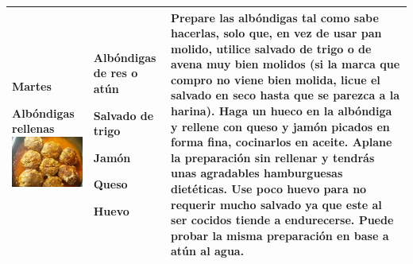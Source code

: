 \documentclass[menu.tex]{subfiles}
\begin{document}
\begin{tabular} {p{3.5cm} p{4cm} p{9cm}}
\pbox{20cm}
{
\rule{0pt}{3ex}\begin{large}\textbf{Martes}\end{large}\\
\rule{0pt}{2ex}Albóndigas rellenas\\
\includegraphics[scale=0.0092]{albondigas-rellenas}
}&
\vspace{-1.6cm}
\begin{compactitem} 
\begin{footnotesize}
\item Albóndigas de res o atún
\item Salvado de trigo
\item Jamón
\item Queso
\item Huevo
\end{footnotesize}
\end{compactitem}&
\vspace{-1.6cm}
Prepare las albóndigas tal como sabe hacerlas, solo que, en vez de usar pan molido, utilice salvado de trigo o de avena muy bien molidos (si la marca que compro no viene bien molida, licue el salvado en seco hasta que se parezca a la harina). Haga un hueco en la albóndiga y rellene con queso y jamón picados en forma fina, cocinarlos en aceite. Aplane la preparación sin rellenar y tendrás unas agradables hamburguesas dietéticas. Use poco huevo para no requerir mucho salvado ya que este al ser cocidos tiende a endurecerse. Puede probar la misma preparación en base a atún al agua.\\
\hline
    

\end{tabular}
\end{document}
